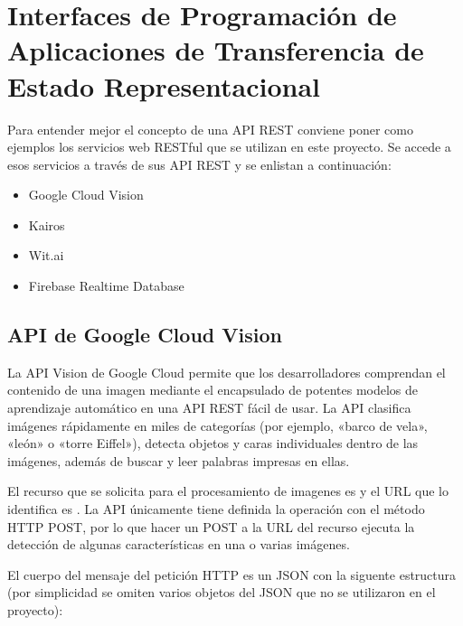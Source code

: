 


\section{Interfaces de Programación de Aplicaciones de Transferencia de Estado Representacional}
\label{\detokenize{chapter_one/apis_rest:interfaces-de-programacion-de-aplicaciones-de-transferencia-de-estado-representacional}}\label{\detokenize{chapter_one/apis_rest::doc}}
Para entender mejor el concepto de una API REST conviene poner como ejemplos
los servicios web RESTful que se utilizan en este proyecto. Se accede
a esos servicios a través de sus API REST y se enlistan a continuación:
\begin{itemize}
\item {} 
Google Cloud Vision

\item {} 
Kairos

\item {} 
Wit.ai

\item {} 
Firebase Realtime Database

\end{itemize}


\subsection{API de Google Cloud Vision}
\label{\detokenize{chapter_one/apis_rest:api-de-google-cloud-vision}}
La API Vision de Google Cloud permite que los desarrolladores comprendan el
contenido de una imagen mediante el encapsulado de potentes modelos de
aprendizaje automático en una API REST fácil de usar. La API clasifica
imágenes rápidamente en miles de categorías (por ejemplo, «barco de vela»,
«león» o «torre Eiffel»), detecta objetos y caras individuales dentro de las
imágenes, además de buscar y leer palabras impresas en ellas.

El recurso que se solicita para el procesamiento de imagenes es  y
el URL que lo identifica es .
La API únicamente tiene definida la operación con el método HTTP POST,
por lo que hacer un POST a la URL del recurso ejecuta la detección de algunas
características en una o varias imágenes.

El cuerpo del mensaje del petición HTTP es un JSON con la siguente estructura
(por simplicidad se omiten varios objetos del JSON que no se utilizaron en el
proyecto):

